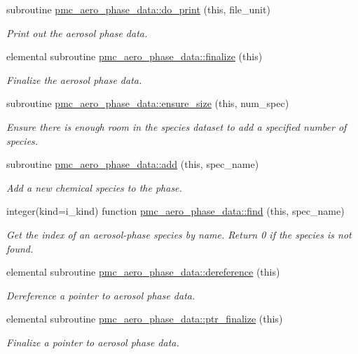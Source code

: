 \begin{DoxyCompactItemize}
subroutine \mbox{\hyperlink{namespacepmc__aero__phase__data_aaf65be8c5ab43c4930479af66b8632b7}{pmc\+\_\+aero\+\_\+phase\+\_\+data\+::do\+\_\+print}} (this, file\+\_\+unit)
\begin{DoxyCompactList}\small\item\em Print out the aerosol phase data. \end{DoxyCompactList}\item 
elemental subroutine \mbox{\hyperlink{namespacepmc__aero__phase__data_afa8f1027a2929a80901a441153ea704f}{pmc\+\_\+aero\+\_\+phase\+\_\+data\+::finalize}} (this)
\begin{DoxyCompactList}\small\item\em Finalize the aerosol phase data. \end{DoxyCompactList}\item 
subroutine \mbox{\hyperlink{namespacepmc__aero__phase__data_a0e833fb6dbec3aecaf272f07e0138663}{pmc\+\_\+aero\+\_\+phase\+\_\+data\+::ensure\+\_\+size}} (this, num\+\_\+spec)
\begin{DoxyCompactList}\small\item\em Ensure there is enough room in the species dataset to add a specified number of species. \end{DoxyCompactList}\item 
subroutine \mbox{\hyperlink{namespacepmc__aero__phase__data_a9f7ffba2277f5781a13e1c9eb6a688e6}{pmc\+\_\+aero\+\_\+phase\+\_\+data\+::add}} (this, spec\+\_\+name)
\begin{DoxyCompactList}\small\item\em Add a new chemical species to the phase. \end{DoxyCompactList}\item 
integer(kind=i\+\_\+kind) function \mbox{\hyperlink{namespacepmc__aero__phase__data_ae63c2f36492266db6cf4e737997689b9}{pmc\+\_\+aero\+\_\+phase\+\_\+data\+::find}} (this, spec\+\_\+name)
\begin{DoxyCompactList}\small\item\em Get the index of an aerosol-\/phase species by name. Return 0 if the species is not found. \end{DoxyCompactList}\item 
elemental subroutine \mbox{\hyperlink{namespacepmc__aero__phase__data_a4fe52583490828dad2d1b882b951679d}{pmc\+\_\+aero\+\_\+phase\+\_\+data\+::dereference}} (this)
\begin{DoxyCompactList}\small\item\em Dereference a pointer to aerosol phase data. \end{DoxyCompactList}\item 
elemental subroutine \mbox{\hyperlink{namespacepmc__aero__phase__data_a4359879599442b607e51b52cab95fab2}{pmc\+\_\+aero\+\_\+phase\+\_\+data\+::ptr\+\_\+finalize}} (this)
\begin{DoxyCompactList}\small\item\em Finalize a pointer to aerosol phase data. \end{DoxyCompactList}\end{DoxyCompactItemize}
